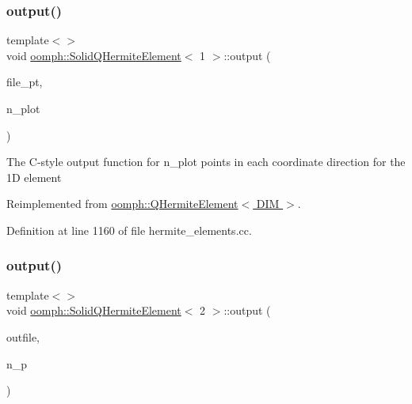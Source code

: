 \subsubsection{\texorpdfstring{output()}{output()}\hspace{0.1cm}{\footnotesize\ttfamily [6/8]}}
{\footnotesize\ttfamily template$<$$>$ \\
void \hyperlink{classoomph_1_1SolidQHermiteElement}{oomph\+::\+Solid\+Q\+Hermite\+Element}$<$ 1 $>$\+::output (\begin{DoxyParamCaption}\item[{F\+I\+LE $\ast$}]{file\+\_\+pt,  }\item[{const unsigned \&}]{n\+\_\+plot }\end{DoxyParamCaption})\hspace{0.3cm}{\ttfamily [virtual]}}

The C-\/style output function for n\+\_\+plot points in each coordinate direction for the 1D element 

Reimplemented from \hyperlink{classoomph_1_1QHermiteElement_a12a4346480e45d82cbfca1f324cd4878}{oomph\+::\+Q\+Hermite\+Element$<$ D\+I\+M $>$}.



Definition at line 1160 of file hermite\+\_\+elements.\+cc.

\mbox{\label{classoomph_1_1SolidQHermiteElement_ade1e06d5bf37699c512cd91c013dd1e9}} 
\subsubsection{\texorpdfstring{output()}{output()}\hspace{0.1cm}{\footnotesize\ttfamily [7/8]}}
{\footnotesize\ttfamily template$<$$>$ \\
void \hyperlink{classoomph_1_1SolidQHermiteElement}{oomph\+::\+Solid\+Q\+Hermite\+Element}$<$ 2 $>$\+::output (\begin{DoxyParamCaption}\item[{std\+::ostream \&}]{outfile,  }\item[{const unsigned \&}]{n\+\_\+p }\end{DoxyParamCaption})\hspace{0.3cm}{\ttfamily [virtual]}}



